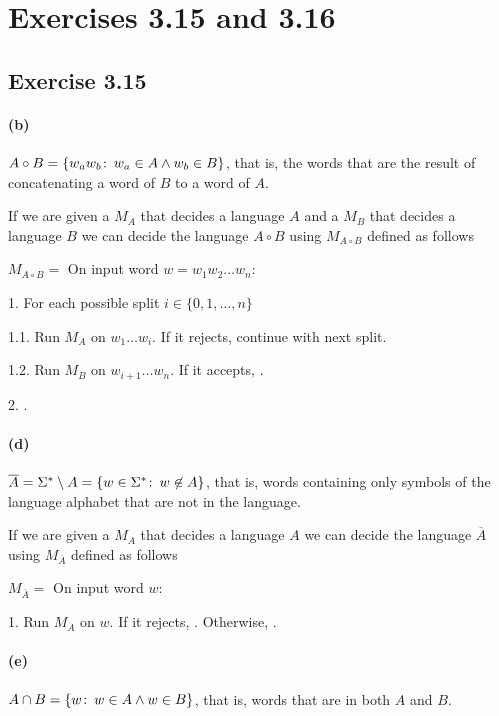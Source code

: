 \section{Exercises 3.15 and 3.16}
\subsection{Exercise 3.15}
\paragraph{(b)} \( A \circ B = \{ w_a w_b \colon\, w_a \in A \land w_b \in B\}\),
that is, the words that are the result of concatenating a word of \(B\) to a
word of \(A\).

If we are given a \TM{} \(M_A\) that decides a language \(A\) and
a \TM{} \(M_B\) that decides a language \(B\) we can decide the
language \(A \circ B\) using \(M_{A \circ B}\) defined as follows
\begin{TMachine}{\(M_{A \circ B} =\) On input word \(w = w_1 w_2 \ldots w_n\):}
\item[1.] For each possible split \(i \in \{0,1,\ldots,n\}\)
\item[1.1.] Run \(M_A\) on \(w_1 \ldots w_i\). If it rejects, continue with next split.
\item[1.2.] Run \(M_B\) on \(w_{i+1} \ldots w_n\). If it accepts, \accept.
\item[2.] \reject.
\end{TMachine}

\paragraph{(d)}
\( \overline{A} = \Sigma^{*} \setminus A = \{ w \in \Sigma^{*} \colon\, w \not \in A
	\}\), that is, words containing only symbols of the language alphabet that are not in the
	language.

If we are given a \TM{} \(M_A\) that decides a language \(A\)
we can decide the
language \(\overline{A}\) using \(M_{\overline{A}}\) defined as follows
\begin{TMachine}{\(M_{\overline{A}} =\) On input word \(w\):}
\item[1.] Run \(M_A\) on \(w\). If it rejects, \accept. Otherwise, \reject.
\end{TMachine}

\paragraph{(e)}
\( A \cap B = \{w \colon\, w \in A \land w \in B\}\), that is, words that are in both \(A\) and \(B\).

